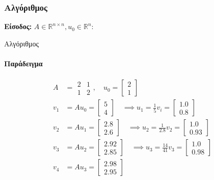 \documentclass[11pt,a4paper,notitlepage,fleqn,final]{article}
\begin{document}
    \subsubsection{Αλγόριθμος}
    \textbf{Είσοδος:} \( A \in \mathbb R^{n\times n},
    u_0 \in \mathbb R^n \):

    \begin{algorithm}[H]
    	\caption{Αλγόριθμος}
\end{algorithm}

\paragraph{Παράδειγμα}
\begin{align*}
A&= \begin{matrix}
2&1\\1&2
\end{matrix},\quad u_0=\left[\begin{matrix}
2\\1
\end{matrix}\right] \\
v_1 &= Au_0 = \left[\begin{matrix}
5\\4
\end{matrix}\right] \quad \implies u_1 = \frac{1}{5}v_i = \left[
\begin{matrix}
1.0\\0.8
\end{matrix}\right] \\
v_2 &= Au_1 = \left[\begin{matrix}
2.8\\2.6
\end{matrix}\right] \quad \implies u_2 = \frac{1}{2.8}v_2 = \left[\begin{matrix}
1.0\\0.93
\end{matrix}\right] \\
v_3 &= Au_2 = \left[\begin{matrix}
2.92\\2.85
\end{matrix}\right] \quad \implies u_3 = \frac{14}{41} v_3 = \left[\begin{matrix}
1.0\\0.98
\end{matrix}\right] \\
v_4 &= Au_3 = \left[\begin{matrix}
2.98\\2.95
\end{matrix}\right]
\end{align*}
\end{document}
